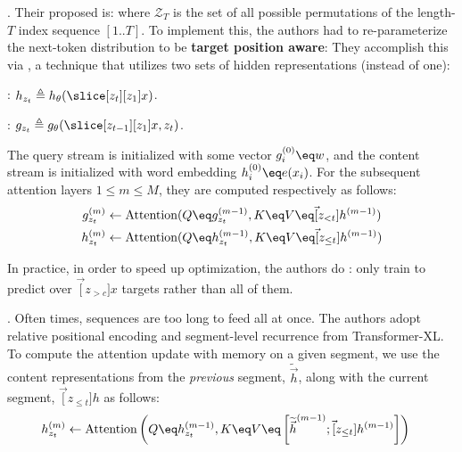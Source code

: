 \documentclass[11pt]{article}
\begin{document}
. Their proposed  is:
where $\mathcal Z_T$ is the set of all possible permutations of the length-$T$ index sequence $[1..T]$. To implement this, the authors had to re-parameterize the next-token distribution to be \textbf{target position aware}:
They accomplish this via , a technique that utilizes two sets of hidden representations (instead of one):
\begin{compactitem}
	\item {}: $h_{z_t} \triangleq h_{\theta}(\slice[z_{t}][z_1]{x})$.
	
	\item {}: $g_{z_t} \triangleq g_{\theta}(\slice[z_{t-1}][z_1]{x}, z_t)$.
\end{compactitem}

The query stream is initialized with some vector $g_i^{(0)} \eq w$, and the content stream is initialized with word embedding $h_i^{(0)} \eq e(x_i)$. For the subsequent attention layers $1 \le m \le M$, they are computed respectively as follows: 
\begin{align}
g_{z_t}^{(m)}
&\leftarrow \text{Attention}(  Q \eq g_{z_t}^{(m-1)},  K \eq  V \eq \vec[z_{<t}]{h}^{(m-1)}      )
\\
h_{z_t}^{(m)}
&\leftarrow \text{Attention}(  Q \eq h_{z_t}^{(m-1)},  K \eq  V \eq \vec[z_{ \leq t}]{h}^{(m-1)}      )
\end{align}


In practice, in order to speed up optimization, the authors do : only train to predict over $\vec[z_{>c}]{x}$ targets rather than all of them.

. Often times, sequences are too long to feed all at once. The authors adopt relative positional encoding and segment-level recurrence from Transformer-XL. To compute the attention update with memory on a given segment, we use the content representations from the \textit{previous} segment, $\widetilde{\vec h}$, along with the current segment, $\vec[z_{\leq t}]{h}$ as follows:
\begin{align}
h_{z_t}^{(m)}
&\leftarrow \text{Attention}\left(
Q \eq h_{z_t}^{(m-1)}, 
K \eq V \eq \left[
\widetilde{\vec h}^{(m-1)};
\vec[z_{\leq t}]{h}^{(m-1)}
\right]
\right)
\end{align}
\end{document}
